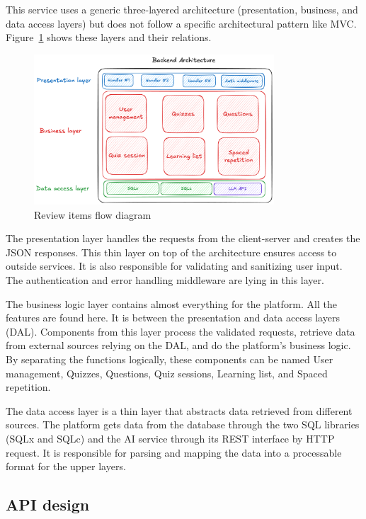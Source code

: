 This service uses a generic three-layered architecture (presentation, business, and data access layers) but does not follow a specific architectural pattern like MVC. Figure~\ref{fig:backend-architecture} shows these layers and their relations.

\begin{figure}[H]
    \centering
    \includegraphics[width=0.8\textwidth, keepaspectratio]{figures/backend-architecture.png}
    \caption{Review items flow diagram}
    \label{fig:backend-architecture}
\end{figure}

The presentation layer handles the requests from the client-server and creates the JSON responses. This thin layer on top of the architecture ensures access to outside services. It is also responsible for validating and sanitizing user input. The authentication and error handling middleware are lying in this layer.

The business logic layer contains almost everything for the platform. All the features are found here. It is between the presentation and data access layers (DAL). Components from this layer process the validated requests, retrieve data from external sources relying on the DAL, and do the platform's business logic. By separating the functions logically, these components can be named User management, Quizzes, Questions, Quiz sessions, Learning list, and Spaced repetition.

The data access layer is a thin layer that abstracts data retrieved from different sources. The platform gets data from the database through the two SQL libraries (SQLx and SQLc) and the AI service through its REST interface by HTTP request. It is responsible for parsing and mapping the data into a processable format for the upper layers.

\subsection{API design}

